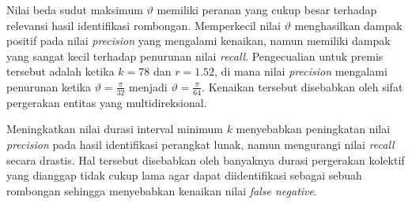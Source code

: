 Nilai beda sudut maksimum $\vartheta$ memiliki peranan yang cukup besar terhadap relevansi hasil identifikasi rombongan. Memperkecil nilai $\vartheta$ menghasilkan dampak positif pada nilai \textit{precision} yang mengalami kenaikan, namun memiliki dampak yang sangat kecil terhadap penurunan nilai \textit{recall}. Pengecualian untuk premis tersebut adalah ketika $k = 78$ dan $r = 1.52$, di mana nilai \textit{precision} mengalami penurunan ketika $\vartheta = \frac{\pi}{32}$ menjadi $\vartheta = \frac{\pi}{64}$. Kenaikan tersebut disebabkan oleh sifat pergerakan entitas yang multidireksional.

Meningkatkan nilai durasi interval minimum $k$ menyebabkan peningkatan nilai \textit{precision} pada hasil identifikasi perangkat lunak, namun mengurangi nilai \textit{recall} secara drastis. Hal tersebut disebabkan oleh banyaknya durasi pergerakan kolektif yang dianggap tidak cukup lama agar dapat diidentifikasi sebagai sebuah rombongan sehingga menyebabkan kenaikan nilai \textit{false negative}. 
